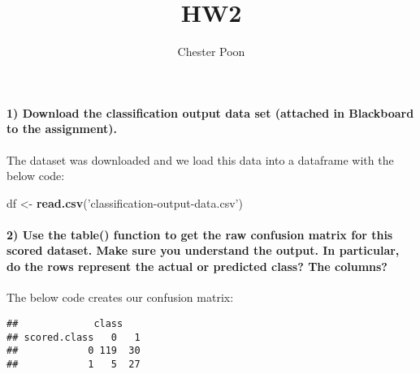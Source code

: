 \documentclass[]{article}
\title{HW2}
\author{Chester Poon}
\date{}
\newenvironment{Shaded}{\begin{snugshade}}{\end{snugshade}}
\newcommand{\KeywordTok}[1]{\textcolor[rgb]{0.13,0.29,0.53}{\textbf{#1}}}
\newcommand{\StringTok}[1]{\textcolor[rgb]{0.31,0.60,0.02}{#1}}
\newcommand{\OperatorTok}[1]{\textcolor[rgb]{0.81,0.36,0.00}{\textbf{#1}}}
\newcommand{\NormalTok}[1]{#1}
\let\oldparagraph\paragraph
\renewcommand{\paragraph}[1]{\oldparagraph{#1}\mbox{}}
\begin{document}
\maketitle

\paragraph{1) Download the classification output data set (attached in
Blackboard to the
assignment).}\label{download-the-classification-output-data-set-attached-in-blackboard-to-the-assignment.}

The dataset was downloaded and we load this data into a dataframe with
the below code:

\begin{Shaded}
\begin{Highlighting}[]
\NormalTok{df <-}\StringTok{ }\KeywordTok{read.csv}\NormalTok{(}\StringTok{'classification-output-data.csv'}\NormalTok{)}
\end{Highlighting}
\end{Shaded}

\paragraph{2) Use the table() function to get the raw confusion matrix
for this scored dataset. Make sure you understand the output. In
particular, do the rows represent the actual or predicted class? The
columns?}\label{use-the-table-function-to-get-the-raw-confusion-matrix-for-this-scored-dataset.-make-sure-you-understand-the-output.-in-particular-do-the-rows-represent-the-actual-or-predicted-class-the-columns}

The below code creates our confusion matrix:

\begin{Shaded}
\end{Shaded}

\begin{verbatim}
##             class
## scored.class   0   1
##            0 119  30
##            1   5  27
\end{verbatim}
\end{document}

